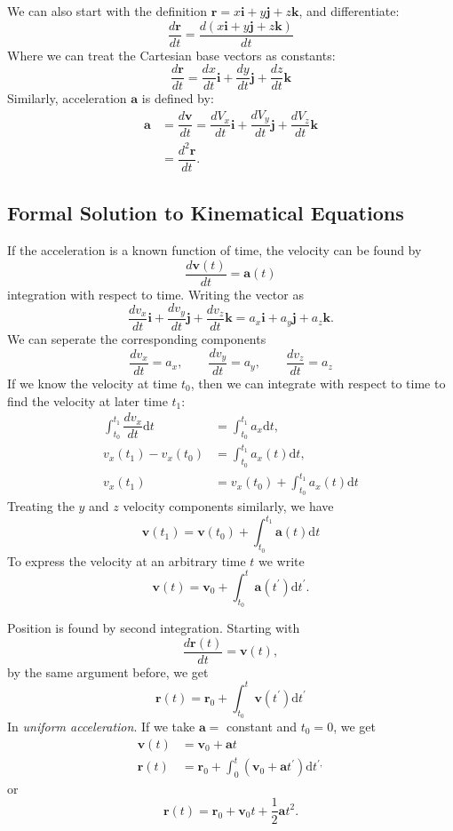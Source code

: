 \documentclass{article}
\begin{document}
{We can also start with the definition $\mathbf{r} = x \mathbf{i} + y\mathbf{j} +
z\mathbf{k}$, and differentiate: 
\[\dfrac{d\mathbf{r}}{dt} = \dfrac{d(x\mathbf{i}+y\mathbf{j}+z\mathbf{k})}{dt}\]
Where we can treat the Cartesian base vectors as constants:
\[\dfrac{d\mathbf{r}}{dt} = \dfrac{dx}{dt}\mathbf{i} +
\dfrac{dy}{dt}\mathbf{j}+\dfrac{dz}{dt}\mathbf{k}\]
Similarly, acceleration $\mathbf{a}$ is defined by:
\begin{align*}
    \mathbf{a} &= \dfrac{d\mathbf{v}}{dt} = \dfrac{dV_x}{dt}\mathbf{i} + \dfrac{dV_y}{dt}\mathbf{j} + \dfrac{dV_z}{dt}\mathbf{k} \\
    &= \dfrac{d^2\mathbf{r}}{dt}.
\end{align*}

\newpage
\subsection{Formal Solution to Kinematical Equations}
If the acceleration is a known function of time, the velocity can be found by
\[\dfrac{d\mathbf{v}(t)}{dt} = \mathbf{a}(t)\]
integration with respect to time. Writing the vector as 
\[\dfrac{dv_x}{dt}\mathbf{i} + \dfrac{dv_y}{dt}\mathbf{j} +
\dfrac{dv_z}{dt}\mathbf{k} = a_x\mathbf{i} + a_y\mathbf{j} + a_z\mathbf{k}.\]
We can seperate the corresponding components 
\[\dfrac{dv_x}{dt}= a_x, \qquad \dfrac{dv_y}{dt} = a_y, \qquad \dfrac{dv_z}{dt}
= a_z\] If we know the velocity at time $t_0$, then we can integrate with
respect to time to find the velocity at later time $t_1$:
\begin{align*}
    \int_{t_0}^{t_1} \dfrac{dv_x}{dt}\mathrm{d}t &= \int_{t_0}^{t_1} a_x \mathrm{d}t, \\[1.25ex]
    v_x(t_1)-v_x(t_0) &= \int_{t_0}^{t_1} a_x(t) \mathrm{d}t, \\[1.25ex]
    v_x(t_1) &= v_x(t_0)+\int_{t_0}^{t_1} a_x(t) \mathrm{d}t
\end{align*}
Treating the $y$ and $z$ velocity components similarly, we have
\[\mathbf{v}(t_1) = \mathbf{v}(t_0) + \int_{t_0}^{t_1} \mathbf{a}(t)\mathrm{d}t\]
To express the velocity at an arbitrary time $t$ we write
\[\mathbf{v}(t) = \mathbf{v}_0 + \int_{t_0}^{t} \mathbf{a}(t^{\prime})\mathrm{d}t^{\prime}.\]

Position is found by second integration. Starting with
\[ \dfrac{d\mathbf{r}(t)}{dt} = \mathbf{v}(t), \]
by the same argument before, we get
\[\mathbf{r}(t) = \mathbf{r}_0 + \int_{t_0}^{t} \mathbf{v}(t^{\prime})
\mathrm{d}t^{\prime}\] In \emph{uniform acceleration}. If we take $\mathbf{a} =
$ constant and $t_0 = 0$, we get
\begin{align*}
    \mathbf{v}(t) &= \mathbf{v}_0 + \mathbf{a}t \\[1.25ex]
    \mathbf{r}(t) &= \mathbf{r}_0 + \int_{0}^{t} (\mathbf{v}_0 + \mathbf{a}t^{\prime})\mathrm{d}t^{\prime,} 
\end{align*}
or 
\[\mathbf{r}(t) = \mathbf{r}_0 + \mathbf{v}_0t + \dfrac{1}{2}\mathbf{a}t^2.\]

}
\end{document}
